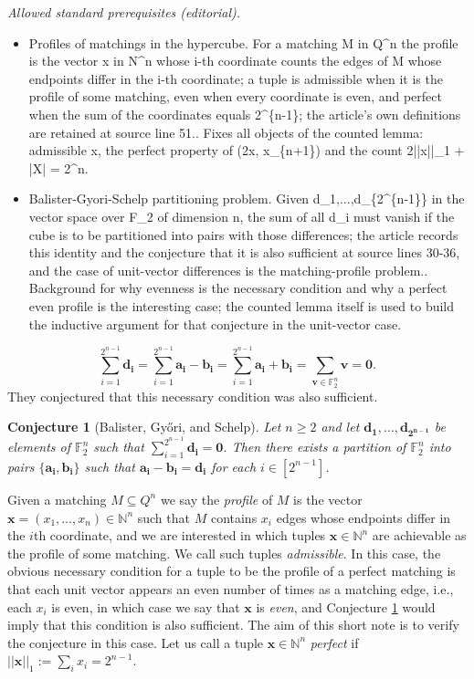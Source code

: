 \documentclass{article}
\newtheorem{conjecture}[theorem]{Conjecture}
\begin{document}
\noindent\textit{Allowed standard prerequisites (editorial).}\begin{itemize}
\item Profiles of matchings in the hypercube. For a matching M in Q\textasciicircum{}n the profile is the vector x in N\textasciicircum{}n whose i-th coordinate counts the edges of M whose endpoints differ in the i-th coordinate; a tuple is admissible when it is the profile of some matching, even when every coordinate is even, and perfect when the sum of the coordinates equals 2\textasciicircum{}\{n-1\}; the article's own definitions are retained at source line 51.. Fixes all objects of the counted lemma: admissible x, the perfect property of (2x, x\_\{n+1\}) and the count 2||x||\_1 + |X| = 2\textasciicircum{}n.
\item Balister-Gyori-Schelp partitioning problem. Given d\_1,...,d\_\{2\textasciicircum{}\{n-1\}\} in the vector space over F\_2 of dimension n, the sum of all d\_i must vanish if the cube is to be partitioned into pairs with those differences; the article records this identity and the conjecture that it is also sufficient at source lines 30-36, and the case of unit-vector differences is the matching-profile problem.. Background for why evenness is the necessary condition and why a perfect even profile is the interesting case; the counted lemma itself is used to build the inductive argument for that conjecture in the unit-vector case.
\end{itemize}\medskip
\begin{equation}\label{e:null}
\sum_{i=1}^{2^{n-1}} \bm{d_i} = \sum_{i=1}^{2^{n-1}}  \bm{a_i} - \bm{b_i} =   \sum_{i=1}^{2^{n-1}}  \bm{a_i} + \bm{b_i} = \sum_{\bm{v} \in \mathbb{F}_2^n} \bm{v} = \bm{0}.
\end{equation}
They conjectured that this necessary condition was also sufficient.
\begin{conjecture}[Balister, Gy{\H{o}}ri, and Schelp]\label{c:BGS}
Let $n \geq 2$ and let $\bm{d_1},\ldots, \bm{d_{2^{n-1}}}$ be elements of $\mathbb{F}_2^n$ such that $\sum_{i=1}^{2^{n-1}} \bm{d_i} = \bm{0}$. Then there exists a partition of $\mathbb{F}_2^n$ into pairs $\{\bm{a_i},\bm{b_i}\}$ such that $\bm{a_i} - \bm{b_i} = \bm{d_i}$ for each $i \in \left[2^{n-1}\right]$.
\end{conjecture}

Given a matching $M \subseteq Q^n$ we say the \emph{profile} of $M$ is the vector $\bm{x}=(x_1,\ldots, x_n) \in \mathbb{N}^n$ such that $M$ contains $x_i$ edges whose endpoints differ in the $i$th coordinate, and we are interested in which tuples $\bm{x} \in \mathbb{N}^n$ are achievable as the profile of some matching. We call such tuples \emph{admissible}. In this case, the obvious necessary condition for a tuple to be the profile of a perfect matching is that each unit vector appears an even number of times as a matching edge, i.e., each $x_i$ is even, in which case we say that $\bm{x}$ is \emph{even}, and Conjecture \ref{c:BGS} would imply that this condition is also sufficient. The aim of this short note is to verify the conjecture in this case. Let us call a tuple $\bm{x} \in \mathbb{N}^n$  \emph{perfect} if $||\bm{x}||_1 := \sum_i x_i = 2^{n-1}$.
\end{document}
